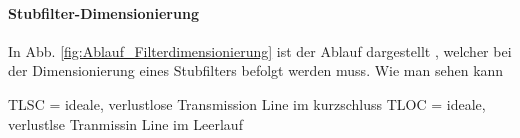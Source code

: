 \paragraph{Stubfilter-Dimensionierung}

In Abb. \ref{fig:Ablauf_Filterdimensionierung} ist der Ablauf dargestellt , welcher bei der Dimensionierung eines Stubfilters befolgt werden muss. Wie man sehen kann 





TLSC = ideale, verlustlose Transmission Line im kurzschluss
TLOC = ideale, verlustlse Tranmissin Line im Leerlauf



\newpage


